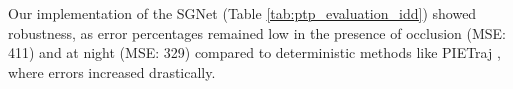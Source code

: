 \documentclass[12pt, a4paper]{article}
\begin{document}
Our implementation of the SGNet \cite{wang2022stepwise} (Table \ref{tab:ptp_evaluation_idd}) showed robustness, as error percentages remained low in the presence of occlusion (MSE: 411) and at night (MSE: 329) compared to deterministic methods like PIETraj \cite{rasouli2019pie}, where errors increased drastically.

\end{document}
